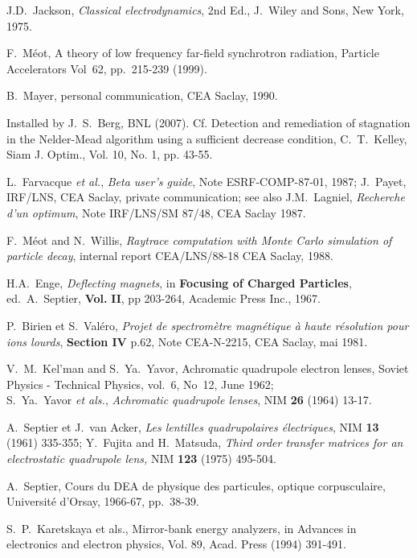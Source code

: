 \begin{thebibliography}{99}
 J.D.~Jackson, \textsl{Classical electrodynamics}, 2nd 
Ed., J.~Wiley and Sons, New York, 1975.

 F.~M\'eot, A theory of low frequency far-field synchrotron radiation, 
 Particle Accelerators Vol~62, pp.~215-239  (1999). 

 B.~Mayer, personal communication,
CEA Saclay, 1990. 

 Installed by J.~S.~Berg, BNL (2007). Cf. Detection and remediation of stagnation in the 
Nelder-Mead algorithm using a sufficient decrease condition, 
  C.~T.~Kelley, Siam J. Optim., Vol. 10, No. 1, pp. 43-55. 

 L.~Farvacque \textsl{et al.}, \textsl{Beta user's guide}, Note 
ESRF-COMP-87-01, 1987; 
J.~Payet, IRF/LNS, CEA Saclay, private communication; see also J.M.~Lagniel, 
\textsl{Recherche d'un optimum}, Note IRF/LNS/SM 87/48, CEA Saclay 1987.

 F.~M\'eot and N.~Willis, \textsl{Raytrace computation with 
Monte Carlo simulation of particle decay}, internal report CEA/LNS/88-18 
CEA Saclay, 1988. 

 H.A.~Enge, \textsl{Deflecting magnets}, in \textbf{Focusing of 
Charged Particles}, ed.~A.~Septier, \textbf{Vol.}  \textbf{II}, pp 203-264, Academic
Press Inc., 1967.

 P.~Birien et S.~Val\'ero, \textsl{Projet de spectrom\`etre 
magn\'etique \`a haute r\'esolution pour ions lourds}, \textbf{Section IV} 
p.62, Note CEA-N-2215, CEA Saclay, mai 1981.

 V.~M.~Kel'man and S.~Ya.~Yavor, Achromatic
quadrupole electron lenses, Soviet Physics - Technical Physics, vol.~6, No~12, June 1962; \\
S.~Ya.~Yavor \textsl{et als.}, \textsl{Achromatic quadrupole lenses}, NIM \textbf{26} (1964) 13-17. 

 A.~Septier et J.~van Acker, \textsl{Les lentilles quadrupolaires 
\'electriques}, NIM \textbf{13} (1961) 335-355; Y.~Fujita and H.~Matsuda, 
\textsl{Third order transfer matrices for an electrostatic quadrupole lens,} 
NIM \textbf{123} (1975) 495-504. 

 A.~Septier, Cours du DEA de physique des
particules, optique corpusculaire, Universit\'e d'Orsay, 1966-67, pp.~38-39.  

 S.~P.~Karetskaya et als., Mirror-bank energy analyzers, in Advances in 
electronics and electron physics, Vol. 89, Acad. Press (1994) 391-491. 


\end{thebibliography}
